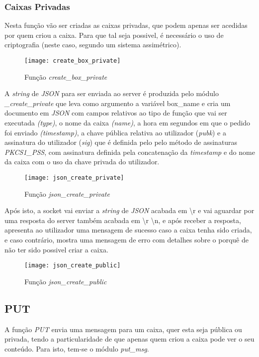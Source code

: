 \documentclass{report}
\begin{document}
\subsubsection{Caixas Privadas}
Nesta função vão ser criadas as caixas privadas, que podem apenas ser acedidas por quem criou a caixa. Para que tal seja possivel, é necessário o uso de criptografia (neste caso, segundo um sistema assimétrico). 

\begin{figure}[h]
\center
\texttt{[image: create\_box\_private]}
\caption{Função \textit{create\_box\_private}}
\label{fig:create_box_private}
\end{figure}

A \textit{string} de \textit{JSON} para ser enviada ao server é produzida pelo módulo \textit{\_create\_private} que leva como argumento a variável box\_name e cria um documento em \textit{JSON} com campos relativos ao tipo de função que vai ser executada \textit{(type)}, o nome da caixa \textit{(name)}, a hora em segundos em que o pedido foi enviado  \textit{(timestamp)}, a chave pública relativa ao utilizador (\textit{pubk}) e a assinatura do utilizador (\textit{sig}) que é definida pelo pelo método de assinaturas \textit{PKCS1\_PSS}, com assinatura definida pela concatenação da \textit{timestamp} e do nome da caixa com o uso da chave privada do utilizador.

\begin{figure}[h]
\center
\texttt{[image: json\_create\_private]}
\caption{Função \textit{json\_create_private}}
\label{fig:json_create_private}
\end{figure}

Após isto, a socket vai enviar a \textit{string} de \textit{JSON} acabada em \textbackslash r \textbackslashn e vai aguardar por uma resposta do server também acabada em \textbackslash r \textbackslash n, e após receber a resposta, apresenta ao utilizador uma mensagem de sucesso caso a caixa tenha sido criada, e caso contrário, mostra uma mensagem de erro com detalhes sobre o porquê de não ter sido possivel criar a caixa.

\begin{figure}[h]
\center
\texttt{[image: json\_create\_public]}
\caption{Função \textit{json\_create_public}}
\label{fig:json_create_public}
\end{figure}


\newpage
\FloatBarrier
\subsection{PUT}
A função \textit{PUT} envia uma mensagem para um caixa, quer esta seja pública ou privada, tendo a particularidade de que apenas quem criou a caixa pode ver o seu conteúdo. Para isto, tem-se o módulo \textit{put\_msg}.
\end{document}
